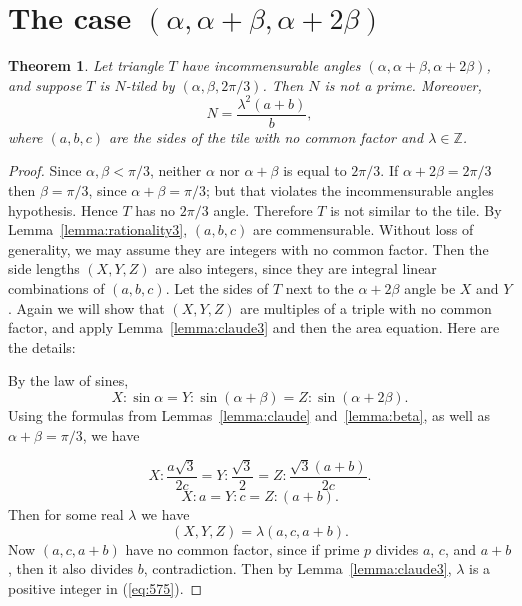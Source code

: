\documentclass{amsart}
\theoremstyle{plain}
\newtheorem{theorem}{Theorem}
\theoremstyle{definition}
\theoremstyle{remark}
\def\Z{{\mathbb Z}}
\begin{document}
\section{The case $(\alpha, \alpha+\beta, \alpha+2\beta)$}
\begin{theorem} \label{theorem:case4}  Let triangle $T$ have incommensurable angles 
$(\alpha, \alpha + \beta, \alpha + 2\beta)$, and suppose $T$ is $N$-tiled by $(\alpha,\beta,2\pi/3)$.
Then $N$ is not a prime.  Moreover, 
$$ N = \frac {\lambda^2 (a+b)} b,$$
where $(a,b,c)$ are the sides of the tile with no common factor and $\lambda \in \Z$.
\end{theorem}

\begin{proof}  
 Since $\alpha, \beta < \pi/3$,  neither $\alpha$ nor $\alpha + \beta$ is equal to $2\pi/3$.
If $\alpha + 2\beta = 2\pi/3$ then $\beta = \pi/3$, since $\alpha + \beta = \pi/3$; but that
violates the incommensurable angles hypothesis.  Hence $T$ has no $2\pi/3$ angle. 
Therefore $T$ is not similar to the tile.
By Lemma~\ref{lemma:rationality3}, $(a,b,c)$ are commensurable.
Without loss of generality, we may assume they are integers with no common factor.
Then the side lengths $(X,Y,Z)$ are also integers, since they are integral linear
combinations of $(a,b,c)$. 
Let the sides of $T$ next to the $\alpha + 2\beta$ angle be $X$ and $Y$.  
Again we will show that $(X,Y,Z)$ are multiples of a triple with no common factor, and apply Lemma~\ref{lemma:claude3} 
and then the area equation.   Here are the details:

By the law of sines,
$$ X: {\sin \alpha} =   Y :{\sin(\alpha + \beta)} = Z :{\sin( \alpha + 2\beta)}.$$
Using the formulas from Lemmas~\ref{lemma:claude} and~\ref{lemma:beta},  as well as $\alpha + \beta = \pi/3$, we have

$$ X: \frac {a \sqrt 3}{2c} = Y:\frac { \sqrt 3 }2 = Z: \frac{\sqrt 3 (a+b)}{2c} .$$
$$ X: a = Y : c = Z: (a+b).$$
Then for some real $\lambda$ we have
\begin{equation}
 (X,Y,Z) = \lambda (a, c, a+b). \label{eq:575}
 \end{equation}
Now $(a, c, a+b)$ have no common factor, since if prime $p$ divides $a$, $c$, and $a+b$, then it also divides $b$,
 contradiction.  
Then by Lemma~\ref{lemma:claude3}, $\lambda$ is a positive integer in (\ref{eq:575}).


\end{proof}
\end{document}

